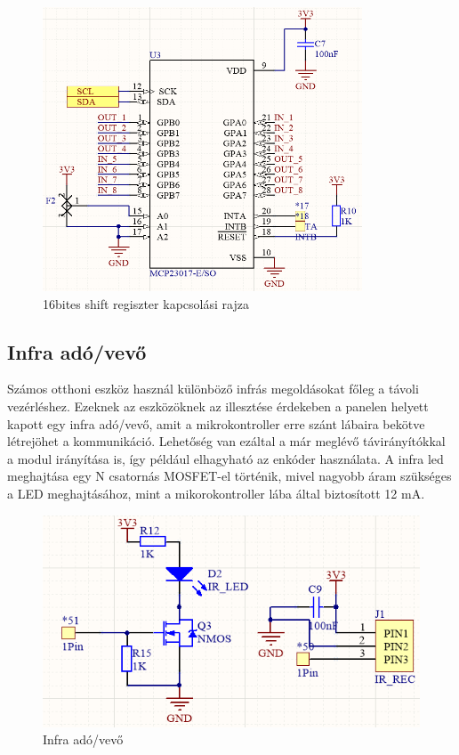 \begin{figure}[!ht]
    \centering
    \includegraphics[width=95mm, keepaspectratio]{figures/16bit_shift_register.png}
    \caption{16bites shift regiszter kapcsolási rajza}
    \label{fig:TeXstudio}
\end{figure}


\subsection{Infra adó/vevő}
Számos otthoni eszköz használ különböző infrás megoldásokat főleg a távoli vezérléshez. Ezeknek az eszközöknek az illesztése érdekeben a panelen helyett kapott egy infra adó/vevő, amit a mikrokontroller erre szánt lábaira bekötve létrejöhet a kommunikáció. Lehetőség van ezáltal a már meglévő távirányítókkal a modul irányítása is, így például elhagyható az enkóder használata.
A infra led meghajtása egy N csatornás MOSFET-el történik, mivel nagyobb áram szükséges a LED meghajtásához, mint a mikorokontroller lába által biztosított 12 mA.
\begin{figure}[!ht]
    \centering
    \includegraphics[width=130mm, keepaspectratio]{figures/infra.png}
    \caption{Infra adó/vevő}
    \label{fig:TeXstudio}
\end{figure}


